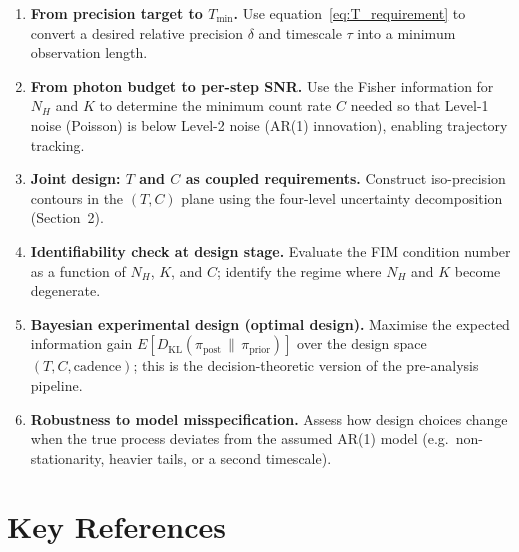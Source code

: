 \documentclass[11pt, a4paper]{article}
\begin{document}
\medskip
\begin{enumerate}[noitemsep]
    \item \textbf{From precision target to $T_{\min}$.}
    Use equation~\eqref{eq:T_requirement} to convert a desired relative precision
    $\delta$ and timescale $\tau$ into a minimum observation length.
    \item \textbf{From photon budget to per-step SNR.}
    Use the Fisher information for $N_H$ and $K$ to determine the minimum count
    rate $C$ needed so that Level-1 noise (Poisson) is below Level-2 noise
    (AR(1) innovation), enabling trajectory tracking.
    \item \textbf{Joint design: $T$ and $C$ as coupled requirements.}
    Construct iso-precision contours in the $(T, C)$ plane using the four-level
    uncertainty decomposition (Section~2).
    \item \textbf{Identifiability check at design stage.}
    Evaluate the FIM condition number as a function of $N_H$, $K$, and $C$;
    identify the regime where $N_H$ and $K$ become degenerate.
    \item \textbf{Bayesian experimental design (optimal design).}
    Maximise the expected information gain $E[D_\mathrm{KL}(\pi_\mathrm{post}\,\|\,\pi_\mathrm{prior})]$
    over the design space $(T, C, \text{cadence})$; this is the decision-theoretic
    version of the pre-analysis pipeline.
    \item \textbf{Robustness to model misspecification.}
    Assess how design choices change when the true process deviates from the
    assumed AR(1) model (e.g.\ non-stationarity, heavier tails, or a second
    timescale).
\end{enumerate}

\section*{Key References}
\end{document}
